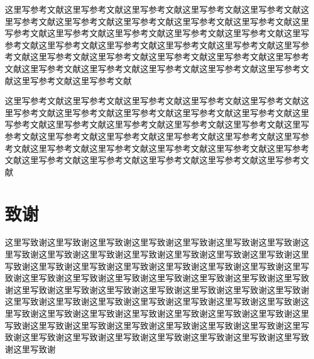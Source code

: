 \documentclass[UTF8,12pt,a4paper]{ctexart}
\begin{document}
\clearpage
\pagestyle{fancy}
\renewcommand{\headrulewidth}{0pt}
\fancyfoot[CO,CE]{\thepage}
\normalem
\printbibliography[title=参考文献]
这里写参考文献这里写参考文献这里写参考文献这里写参考文献这里写参考文献这里写参考文献这里写参考文献这里写参考文献这里写参考文献这里写参考文献这里写参考文献这里写参考文献这里写参考文献这里写参考文献这里写参考文献这里写参考文献这里写参考文献这里写参考文献这里写参考文献这里写参考文献这里写参考文献这里写参考文献这里写参考文献这里写参考文献这里写参考文献这里写参考文献这里写参考文献这里写参考文献这里写参考文献这里写参考文献这里写参考文献这里写参考文献这里写参考文献

这里写参考文献这里写参考文献这里写参考文献这里写参考文献这里写参考文献这里写参考文献这里写参考文献这里写参考文献这里写参考文献这里写参考文献这里写参考文献这里写参考文献这里写参考文献这里写参考文献这里写参考文献这里写参考文献这里写参考文献这里写参考文献这里写参考文献这里写参考文献这里写参考文献这里写参考文献这里写参考文献这里写参考文献这里写参考文献这里写参考文献这里写参考文献这里写参考文献这里写参考文献这里写参考文献这里写参考文献

\clearpage
\pagestyle{fancy}
\renewcommand{\headrulewidth}{0pt}
\fancyfoot[CO,CE]{\thepage}
\section*{致谢}

这里写致谢这里写致谢这里写致谢这里写致谢这里写致谢这里写致谢这里写致谢这里写致谢这里写致谢这里写致谢这里写致谢这里写致谢这里写致谢这里写致谢这里写致谢这里写致谢这里写致谢这里写致谢这里写致谢这里写致谢这里写致谢这里写致谢这里写致谢这里写致谢这里写致谢这里写致谢这里写致谢这里写致谢这里写致谢这里写致谢这里写致谢这里写致谢这里写致谢这里写致谢这里写致谢这里写致谢这里写致谢这里写致谢这里写致谢这里写致谢这里写致谢这里写致谢这里写致谢这里写致谢这里写致谢这里写致谢这里写致谢这里写致谢这里写致谢这里写致谢这里写致谢这里写致谢这里写致谢这里写致谢这里写致谢这里写致谢这里写致谢这里写致谢这里写致谢这里写致谢这里写致谢这里写致谢这里写致谢这里写致谢这里写致谢这里写致谢
\end{document}
